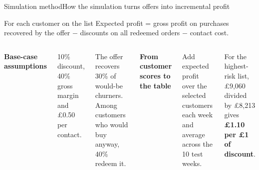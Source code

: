 \begin{frame}{Simulation method}{How the simulation turns offers into incremental profit}
  \vspace{0.2cm}
  \begin{block}{For each customer on the list}
    Expected profit = gross profit on purchases recovered by the offer $-$ discounts on all redeemed orders $-$ contact cost.
  \end{block}
  \vspace{0.3cm}
  \begin{columns}[T]
    {\large\bfseries Base-case assumptions\par}
    \vspace{6pt}
    {10\% discount, 40\% gross margin and \pounds0.50 per contact.\par}
    \vspace{6pt}
    {The offer recovers 30\% of would-be churners. Among customers who would buy anyway, 40\% redeem it.\par}
    {\large\bfseries From customer scores to the table\par}
    \vspace{6pt}
    {Add expected profit over the selected customers each week and average across the 10 test weeks.\par}
    \vspace{6pt}
    {For the highest-risk list, \pounds9,060 divided by \pounds8,213 gives \textbf{\pounds1.10 per \pounds1 of discount}.\par}
  \end{columns}
\end{frame}
